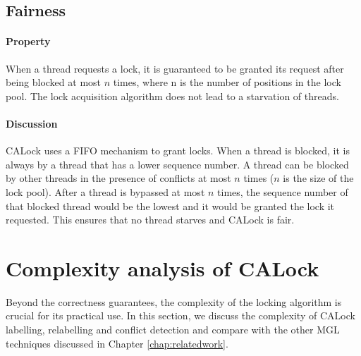 \subsection[Fairness]{Fairness}
\paragraph{Property} When a thread requests a lock, it is guaranteed to be granted its request after being blocked at most $\mathit{n}$ times, where n is the number of positions in the lock pool. 
The lock acquisition algorithm does not lead to a starvation of threads.

\paragraph{Discussion}
CALock uses a FIFO mechanism to grant locks. When a thread is blocked, it is always by a thread that has a lower sequence number.
A thread can be blocked by other threads in the presence of conflicts at most $n$ times ($n$ is the size of the lock pool).  
After a thread is  bypassed at most $n$ times, the sequence number of that blocked thread would be the lowest and it would be granted the lock it requested. 
This ensures that no thread starves and CALock is fair.


\section{Complexity analysis of CALock} \label{complexityAnalysis}

Beyond the correctness guarantees, the complexity of the locking algorithm is crucial for its practical use. In this section, we discuss the complexity of CALock labelling, relabelling and conflict detection and compare with the other MGL techniques discussed in Chapter \ref{chap:relatedwork}.


